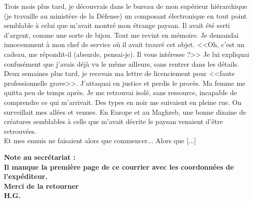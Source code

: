 \documentclass[11pt,twoside,a4paper]{article}
\begin{document}
\begin{minipage}[ht]{0.75\textwidth}
\begin{ttfamily}
Trois mois plus tard, je d{\'e}couvrais dans le bureau de mon sup{\'e}rieur hi{\'e}rarchique (je travaille au minist{\`e}re de la D{\'e}fense) un composant {\'e}lectronique en tout point semblable {\`a} celui que m'avait montr{\'e} mon {\'e}trange paysan. Il avait {\'e}t{\'e} serti d'argent, comme une sorte de bijou. Tout me revint en m{\'e}moire. Je demandai innocemment {\`a} mon chef de service o{\`u} il avait trouv{\'e} cet objet. <<Oh, c'est un cadeau, me r{\'e}pondit-il (absurde, pensai-je). Il vous int{\'e}resse ?>> Je lui expliquai confus{\'e}ment que j'avais d{\'e}j{\`a} vu le m{\^e}me ailleurs, sans rentrer dans les d{\'e}tails. ~\\

Deux semaines plus tard, je recevais ma lettre de licenciement pour <<faute professionnelle grave>>. J'attaquai en justice et perdis le proc{\`e}s. Ma femme me quitta peu de temps apr{\`e}s. Je me retrouvai isol{\'e}, sans ressource, incapable de comprendre ce qui m'arrivait. Des types en noir me suivaient en pleine rue. On surveillait mes all{\'e}es et venues. En Europe et au Maghreb, une bonne dizaine de cr{\'e}atures semblables {\`a} celle que m'avait d{\'e}crite le paysan venaient d'{\^e}tre retrouv{\'e}es. ~\\

Et mes ennuis ne faisaient alors que commencer... Alors que [...] ~\\
	\end{ttfamily}
\end{minipage} \hfill \begin{minipage}[ht]{0.20\textwidth}
	\footnotesize	\bfseries
		Note au secr{\'e}tariat :~\\ 
		Il manque la premi{\`e}re page de ce courrier avec les coordonn{\'e}es de l'exp{\'e}diteur. ~\\
		Merci de la retourner~\\
			H.G.~\\
\end{minipage}
\end{document}

